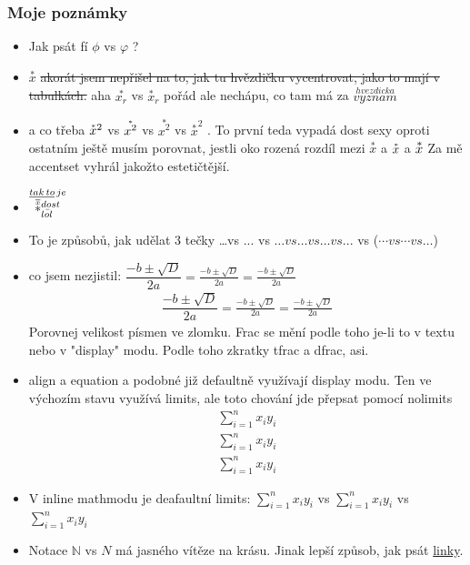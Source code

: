 \documentclass[12pt]{article}
\begin{document}
\subsubsection{Moje poznámky}
\begin{itemize}
\item Jak psát fí $\phi$ vs $\varphi$ ?
\item  $\overset{*}{x}$ \st{ akorát jsem nepřišel na to, jak tu hvězdičku vycentrovat, jako to mají v tabulkách.} aha $\overset{*}{x_r}$ vs $\overset{*}{x}_r$ pořád ale  nechápu, co tam má za $ \overset{hvezdicka}{vyznam}$ \\
\item a co třeba $\accentset{*}{x}^2$ vs $\accentset{*}{x^2}$ vs $\overset{*}{x^2}$ vs $\overset{*}{x}^2$ . To první teda vypadá dost sexy oproti ostatním ještě musím porovnat, jestli oko rozená rozdíl mezi $\overset{*}{x}$ a $\accentset{*}{x}$ a $\accentset{\scriptstyle *}{x}$ Za mě accentset vyhrál jakožto estetičtější.
\item $\overset{\underline{tak\, to}\, je}{ \accentset{\overline{x}}{*}_{\bar{lol}}^{dost}}$
\item To je způsobů, jak udělat 3 tečky \dots vs ... vs $ \dots vs \ldots vs \dotsc vs ...$ vs ($\dotsm vs \dotsb vs \dotso $)
\item co jsem nezjistil: $\dfrac{-b \pm \sqrt{D}}{2a} = \frac{-b \pm \sqrt{D}}{2a} = \tfrac{-b \pm \sqrt{D}}{2a} $
\begin{align*}
\dfrac{-b \pm \sqrt{D}}{2a} = \frac{-b \pm \sqrt{D}}{2a} = \tfrac{-b \pm \sqrt{D}}{2a}
\end{align*}
Porovnej velikost písmen ve zlomku. Frac se mění podle toho je-li to v textu nebo v "display" modu. Podle toho zkratky tfrac a dfrac, asi.
\item align a equation a podobné již defaultně využívají display modu. Ten ve výchozím stavu využívá limits, ale toto chování jde přepsat pomocí nolimits
\begin{align*}
\sum^n_{i=1}x_i y_i \\
\sum\limits^n_{i=1}x_i y_i \\
\sum\nolimits^n_{i=1}x_i y_i
\end{align*}
\item V inline mathmodu je deafaultní limits: $ \sum^n_{i=1}x_i y_i$ vs $ \sum\limits^n_{i=1}x_i y_i$ vs $ \sum\nolimits^n_{i=1}x_i y_i$
\item  Notace $\mathbb{N}$ vs $N$ má jasného vítěze na krásu. Jinak lepší způsob, jak psát \href{https://www.latex-tutorial.com/tutorials/hyperlinks/}{linky}.

\end{itemize}
\end{document}
